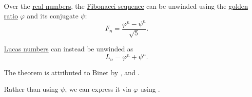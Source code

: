 \begin{theorem}\label{thm:binets_fibonacci_number_formula}
  Over the \hyperref[def:real_numbers]{real numbers}, the \hyperref[def:fibonacci_numbers]{Fibonacci sequence} can be unwinded using the \hyperref[def:golden_ratio]{golden ratio} \( \varphi \) and its conjugate \( \psi \):
  \begin{equation}\label{eq:thm:binets_formula/fibonacci}
    F_n = \frac {\varphi^n - \psi^n} {\sqrt 5}.
  \end{equation}

  \hyperref[def:lucas_numbers]{Lucas numbers} can instead be unwinded as
  \begin{equation}\label{eq:thm:binets_formula/lucas}
    L_n = \varphi^n + \psi^n.
  \end{equation}
\end{theorem}
\begin{comments}
  \item The theorem is attributed to Binet by ,  and .
  \item Rather than using \( \psi \), we can express it via \( \varphi \) using .
\end{comments}
